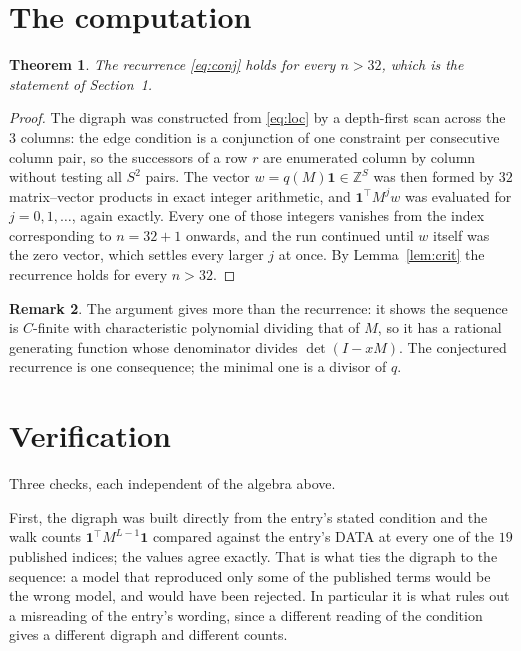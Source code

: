 \documentclass[11pt,a4paper]{article}
\theoremstyle{plain}
\newtheorem{theorem}{Theorem}
\theoremstyle{definition}
\newtheorem{remark}[theorem]{Remark}
\begin{document}
\section{The computation}

\begin{theorem}
The recurrence \eqref{eq:conj} holds for every $n>32$, which is the statement of
Section~1.
\end{theorem}

\begin{proof}
The digraph was constructed from \eqref{eq:loc} by a depth-first scan across the $3$
columns: the edge condition is a conjunction of one constraint per consecutive column
pair, so the successors of a row $r$ are enumerated column by column without testing all
$S^2$ pairs. The vector $w=q(M)\mathbf{1}\in\mathbb{Z}^{S}$ was then formed by $32$
matrix--vector products in exact integer arithmetic, and $\mathbf{1}^{\!\top}M^{j}w$ was
evaluated for $j=0,1,\dots$, again exactly. Every one of those integers vanishes from the
index corresponding to $n=32+1$ onwards, and the run continued until $w$ itself was the
zero vector, which settles every larger $j$ at once. By Lemma~\ref{lem:crit} the recurrence
holds for every $n>32$.
\end{proof}

\begin{remark}
The argument gives more than the recurrence: it shows the sequence is $C$-finite with
characteristic polynomial dividing that of $M$, so it has a rational generating function
whose denominator divides $\det(I-xM)$. The conjectured recurrence is one consequence; the
minimal one is a divisor of $q$.
\end{remark}

\section{Verification}

Three checks, each independent of the algebra above.

First, the digraph was built directly from the entry's stated condition and the walk counts
$\mathbf{1}^{\!\top}M^{L-1}\mathbf{1}$ compared against the entry's DATA at
every one of the $19$ published indices; the values agree exactly. That is what ties
the digraph to the sequence: a model that reproduced only some of the published terms would
be the wrong model, and would have been rejected. In particular it is what rules out a
misreading of the entry's wording, since a different reading of the condition gives a
different digraph and different counts.
\end{document}
